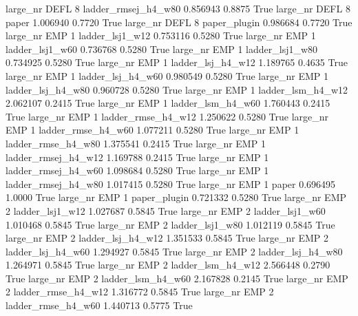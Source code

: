  large_nr     DEFL                 8 ladder_rmsej_h4_w80    0.856943      0.8875    True
  large_nr     DEFL                 8               paper    1.006940      0.7720    True
  large_nr     DEFL                 8        paper_plugin    0.986684      0.7720    True
  large_nr      EMP                 1     ladder_lsj1_w12    0.753116      0.5280    True
  large_nr      EMP                 1     ladder_lsj1_w60    0.736768      0.5280    True
  large_nr      EMP                 1     ladder_lsj1_w80    0.734925      0.5280    True
  large_nr      EMP                 1   ladder_lsj_h4_w12    1.189765      0.4635    True
  large_nr      EMP                 1   ladder_lsj_h4_w60    0.980549      0.5280    True
  large_nr      EMP                 1   ladder_lsj_h4_w80    0.960728      0.5280    True
  large_nr      EMP                 1   ladder_lsm_h4_w12    2.062107      0.2415    True
  large_nr      EMP                 1   ladder_lsm_h4_w60    1.760443      0.2415    True
  large_nr      EMP                 1  ladder_rmse_h4_w12    1.250622      0.5280    True
  large_nr      EMP                 1  ladder_rmse_h4_w60    1.077211      0.5280    True
  large_nr      EMP                 1  ladder_rmse_h4_w80    1.375541      0.2415    True
  large_nr      EMP                 1 ladder_rmsej_h4_w12    1.169788      0.2415    True
  large_nr      EMP                 1 ladder_rmsej_h4_w60    1.098684      0.5280    True
  large_nr      EMP                 1 ladder_rmsej_h4_w80    1.017415      0.5280    True
  large_nr      EMP                 1               paper    0.696495      1.0000    True
  large_nr      EMP                 1        paper_plugin    0.721332      0.5280    True
  large_nr      EMP                 2     ladder_lsj1_w12    1.027687      0.5845    True
  large_nr      EMP                 2     ladder_lsj1_w60    1.010468      0.5845    True
  large_nr      EMP                 2     ladder_lsj1_w80    1.012119      0.5845    True
  large_nr      EMP                 2   ladder_lsj_h4_w12    1.351533      0.5845    True
  large_nr      EMP                 2   ladder_lsj_h4_w60    1.294927      0.5845    True
  large_nr      EMP                 2   ladder_lsj_h4_w80    1.264971      0.5845    True
  large_nr      EMP                 2   ladder_lsm_h4_w12    2.566448      0.2790    True
  large_nr      EMP                 2   ladder_lsm_h4_w60    2.167828      0.2145    True
  large_nr      EMP                 2  ladder_rmse_h4_w12    1.316772      0.5845    True
  large_nr      EMP                 2  ladder_rmse_h4_w60    1.440713      0.5775    True
